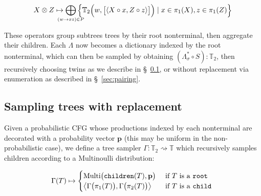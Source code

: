 \documentclass[sigplan,nonacm,anonymous]{acmart}\settopmatter{printfolios=false,printccs=false,printacmref=false}
\begin{document}
\begin{equation*}
  \begin{footnotesize}
  X \otimes Z \mapsto \bigoplus_{\mathclap{(w\rightarrow xz) \in P}}\Big\{\mathbb{T}_2\Big(w, \big[\langle X\circ x, Z\circ z\rangle\big]\Big) \mid x \in \pi_1(X), z \in \pi_1(Z)\Big\}
\end{footnotesize}
\end{equation*}

  These operators group subtrees trees by their root nonterminal, then aggregate their children. Each $\Lambda$ now becomes a dictionary indexed by the root nonterminal, which can then be sampled by obtaining $(\Lambda_\sigma^* \circ S): \mathbb{T}_2$, then recursively choosing twins as we describe in \S~\ref{sec:replacement}, or without replacement via enumeration as described in \S~\ref{sec:pairing}.


\subsection{Sampling trees with replacement}\label{sec:replacement}

Given a probabilistic CFG whose productions indexed by each nonterminal are decorated with a probability vector $\mathbf{p}$ (this may be uniform in the non-probabilistic case), we define a tree sampler $\Gamma: \mathbb{T}_2 \rightsquigarrow \mathbb{T}$ which recursively samples children according to a Multinoulli distribution:

\begin{equation*}
  \Gamma(T) \mapsto \begin{cases}
        \text{Multi} \big(\texttt{children}(T), \mathbf{p}\big) & \text{ if $T$ is a \texttt{root}} \\
        \big\langle \Gamma\big(\pi_1(T)\big), \Gamma\big(\pi_2(T)\big) \big\rangle & \text{ if $T$ is a \texttt{child} }
  \end{cases}
\end{equation*}
\end{document}
